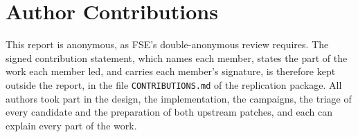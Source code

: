 \section*{Author Contributions}
\label{sec:contributions}

This report is anonymous, as FSE's double-anonymous review requires. The signed
contribution statement, which names each member, states the part of the work
each member led, and carries each member's signature, is therefore kept outside
the report, in the file \texttt{CONTRIBUTIONS.md} of the replication package.
All authors took part in the design, the implementation, the campaigns, the
triage of every candidate and the preparation of both upstream patches, and each
can explain every part of the work.
